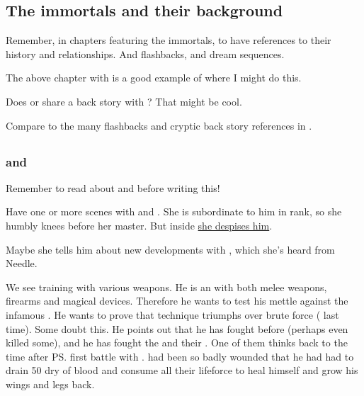 \begin{garbage}
\subsection{The immortals and their background}
Remember, in chapters featuring the immortals, to have references to their history and relationships. 
And flashbacks, and dream sequences.

The above chapter with \Achsah{} is a good example of where I might do this. 

Does \Achsah{} or \Teshrial{} share a back story with \Ishnaruchaefir? That might be cool. 

Compare to the many flashbacks and cryptic back story references in \cite{StevenEriksonIanCameronEsslemont:MalazanBookoftheFallen}. 









\subsection{\Achsah}
\subsubsection{\Achsah{} and \Teshrial}
Remember to read about \hs{\Achsah} and \hs{\Teshrial} before writing this! 

Have one or more scenes with \Achsah{} and \Teshrial. She is subordinate to him in rank, so she humbly knees before her master. But inside \hyperref[Achsah hates Teshrial]{she despises him}. 

Maybe she tells him about new developments with \Tiroco, which she's heard from Needle. 

We see \Teshrial{} training with various weapons. 
He is an  with both melee weapons, firearms and magical devices. 
Therefore he wants to test his mettle against the infamous \Ishnaruchaefir. 
He wants to prove that technique triumphs over brute force ( last time). 
Some \resphain{} doubt this. 
He points out that he has fought \dragons{} before (perhaps even killed some), and he has fought the \Baelzerach{} and their \daemons. 
One of them thinks back to the time after \ps{\Teshrial} first battle with \Ishnaruchaefir. 
\Teshrial{} had been so badly wounded that he had had to drain 50 \humans{} dry of blood and consume all their lifeforce to heal himself and grow his wings and legs back.  


\end{garbage}
